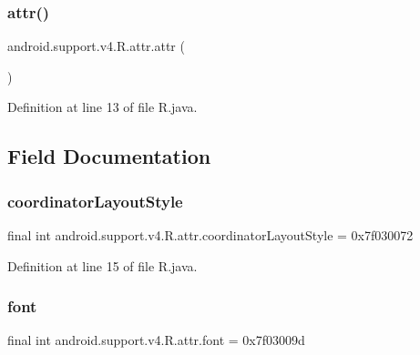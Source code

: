 \subsubsection{\texorpdfstring{attr()}{attr()}}
{\footnotesize\ttfamily android.\+support.\+v4.\+R.\+attr.\+attr (\begin{DoxyParamCaption}{ }\end{DoxyParamCaption})\hspace{0.3cm}{\ttfamily [private]}}



Definition at line 13 of file R.\+java.


\begin{DoxyCode}{0}

\end{DoxyCode}


\subsection{Field Documentation}
\mbox{\label{classandroid_1_1support_1_1v4_1_1_r_1_1attr_a5db35f80b8f3fca0907f24dc7765fd3c}} 
\subsubsection{\texorpdfstring{coordinatorLayoutStyle}{coordinatorLayoutStyle}}
{\footnotesize\ttfamily final int android.\+support.\+v4.\+R.\+attr.\+coordinator\+Layout\+Style = 0x7f030072\hspace{0.3cm}{\ttfamily [static]}}



Definition at line 15 of file R.\+java.

\mbox{\label{classandroid_1_1support_1_1v4_1_1_r_1_1attr_a784b971c7ce1ca8f41748ba7abcc48f5}} 
\subsubsection{\texorpdfstring{font}{font}}
{\footnotesize\ttfamily final int android.\+support.\+v4.\+R.\+attr.\+font = 0x7f03009d\hspace{0.3cm}{\ttfamily [static]}}



